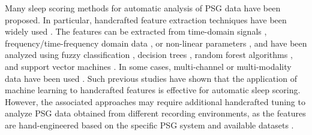 \documentclass[10pt,twocolumn,twoside]{IEEEtran}
\begin{document}
    Many sleep scoring methods for automatic analysis of PSG data have been proposed. In particular, handcrafted feature extraction techniques have been widely used \cite{aboalayon2016sleep}. The features can be extracted from time-domain signals \cite{li2017hyclasss,koley2012ensemble}, frequency/time-frequency domain data \cite{sharma2017automatic,hassan2016decision,langkvist2012sleep,fraiwan2012automated,berthomier2007automatic}, or non-linear parameters \cite{hassan2016computer,lajnef2015learning,liang2012automatic}, and have been analyzed using fuzzy classification \cite{berthomier2007automatic}, decision trees \cite{hassan2016computer}, random forest algorithms \cite{li2017hyclasss,sharma2017automatic,hassan2016decision,fraiwan2012automated}, and support vector machines \cite{lajnef2015learning,zhu2014analysis,koley2012ensemble}. In some cases, multi-channel or multi-modality data have been used \cite{stephansen2017use,lajnef2015learning}. Such previous studies have shown that the application of machine learning to handcrafted features is effective for automatic sleep scoring. However, the associated approaches may require additional handcrafted tuning to analyze PSG data obtained from different recording environments, as the features are hand-engineered based on the specific PSG system and available datasets \cite{supratak2017deepsleepnet}.
    
\end{document}
